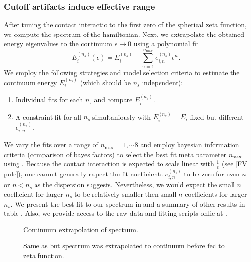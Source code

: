 \subsubsection{Cutoff artifacts induce effective range}

After tuning the contact interactio to the first zero of the spherical zeta function, we compute the spectrum of the hamiltonian.
Next, we extrapolate the obtained energy eigenvalues to the continuum $\epsilon \to 0$ using a polynomial fit
\begin{equation}
    E^{(n_s)}_i(\epsilon) = E_i^{(n_s)} + \sum\limits_{n=1}^{n_\mathrm{max}} e_{i,n}^{(n_s)} \epsilon^n \, .
\end{equation}
We employ the following strategies and model selection criteria to estimate the continuum energy $E_i^{(n_s)}$ (which should be $n_s$ independent):
\begin{enumerate}
    \item Individual fits for each $n_s$ and compare $E_i^{(n_s)}$.
    \item A constraint fit for all $n_s$ simultaniously with $E_i^{(n_s)} = E_i$ fixed but different $e_{i,n}^{(n_s)}$.
\end{enumerate}
We vary the fits over a range of $n_\mathrm{max}=1, \cdots 8$ and employ bayesian information criteria (comparison of bayes factors) to select the best fit meta parameter $n_\mathrm{max}$ using \cite{peter_lepage_2016_60221}.
Because the contact interaction is expected to scale linear with $\frac{1}{\epsilon}$ (see \eqref{FV pole}), one cannot generally expect the fit coefficients $e_{i,n}^{(n_s)}$ to be zero for even $n$ or $n < n_s$ as the dispersion suggests.
Nevertheless, we would expect the small $n$ coefficient for larger $n_s$ to be relatively smaller then small $n$ coefficients for larger $n_s$.
We present the best fit to our spectrum in  and a summary of other results in table .
Also, we provide access to the raw data and fitting scripts onlie at \cite{repo}.


\begin{figure}[th]
    \scalebox{0.9}{}
    \caption{Continuum extrapolation of spectrum.}
    \label{fig:continuum-extrapolation-spectrum}
\end{figure}


\begin{figure}[th]
    \scalebox{0.9}{}
    \caption{Same as  but spectrum was extrapolated to continuum before fed to zeta function.}
    \label{fig:unimproved spherical continuum extrapolation}
\end{figure}

